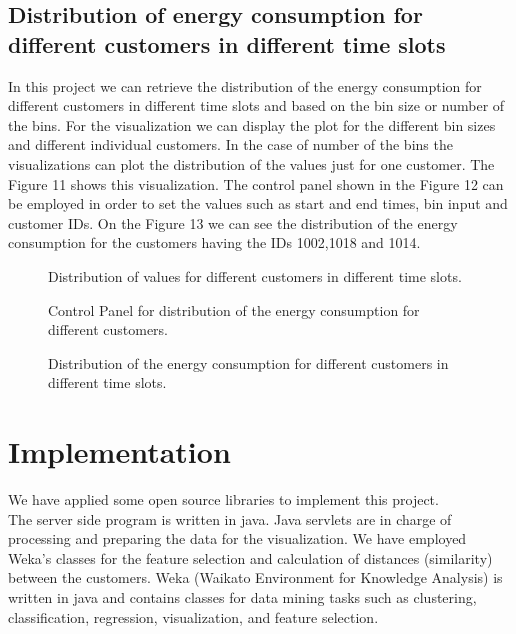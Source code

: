 \documentclass{sig-alternate-10pt}
\begin{document}
\subsection{Distribution of energy consumption for different customers in different time slots}

In this project we can retrieve the distribution of the energy consumption for different customers in different time slots and based on the bin size or number of the bins. For the visualization we can display the plot for the different bin sizes and different individual customers. In the case of number of the bins the visualizations can plot the distribution of the values just for one customer. The Figure 11 shows this visualization. The control panel shown in the Figure 12 can be employed in order to set the values such as start and end times, bin input and customer IDs. On the Figure 13 we can see the distribution of the energy consumption for the customers having the IDs 1002,1018 and 1014. 

\begin{figure*}
\centering
{}
\caption{Distribution of values for different customers in different time slots.}
\end{figure*}


\begin{figure}
\centering
{}
\caption{Control Panel for distribution of the energy consumption for different customers.}
\end{figure}

\begin{figure}
\centering
{}
\caption{Distribution of the energy consumption for different customers in different time slots.}
\end{figure}

\section{Implementation}

We have applied some open source libraries to implement this project.\\

The server side program is written in java. Java servlets are in charge of processing and preparing the data for the visualization. We have employed Weka's classes for the feature selection and calculation of distances (similarity) between the customers. Weka (Waikato Environment for Knowledge Analysis) is written in java and contains classes for data mining tasks such as clustering, classification, regression, visualization, and feature selection.\cite{6}\\
\end{document}
